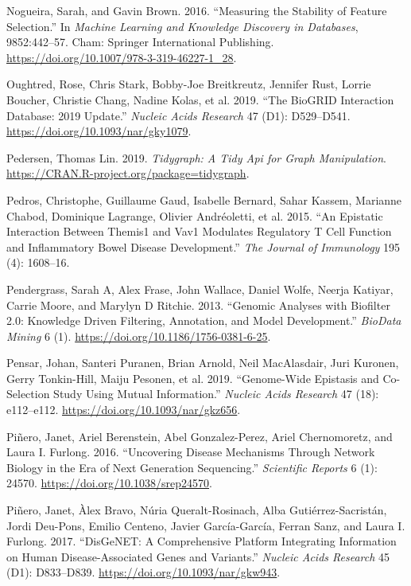 \documentclass[
  11pt,
]{env/yjiao}
\newlength{\cslhangindent}
\newenvironment{cslreferences}%
  {\setlength{\parindent}{0pt}%
  \everypar{\setlength{\hangindent}{\cslhangindent}}\ignorespaces}%
  {\par}
\begin{document}
\begin{cslreferences}
\leavevmode\hypertarget{ref-nogueira_measuring_2016}{}%
Nogueira, Sarah, and Gavin Brown. 2016. ``Measuring the Stability of Feature Selection.'' In \emph{Machine Learning and Knowledge Discovery in Databases}, 9852:442--57. Cham: Springer International Publishing. \url{https://doi.org/10.1007/978-3-319-46227-1_28}.

\leavevmode\hypertarget{ref-oughtred_biogrid_2019}{}%
Oughtred, Rose, Chris Stark, Bobby-Joe Breitkreutz, Jennifer Rust, Lorrie Boucher, Christie Chang, Nadine Kolas, et al. 2019. ``The BioGRID Interaction Database: 2019 Update.'' \emph{Nucleic Acids Research} 47 (D1): D529--D541. \url{https://doi.org/10.1093/nar/gky1079}.

\leavevmode\hypertarget{ref-pedersen_tidygraph_2019}{}%
Pedersen, Thomas Lin. 2019. \emph{Tidygraph: A Tidy Api for Graph Manipulation}. \url{https://CRAN.R-project.org/package=tidygraph}.

\leavevmode\hypertarget{ref-pedros2015epistatic}{}%
Pedros, Christophe, Guillaume Gaud, Isabelle Bernard, Sahar Kassem, Marianne Chabod, Dominique Lagrange, Olivier Andréoletti, et al. 2015. ``An Epistatic Interaction Between Themis1 and Vav1 Modulates Regulatory T Cell Function and Inflammatory Bowel Disease Development.'' \emph{The Journal of Immunology} 195 (4): 1608--16.

\leavevmode\hypertarget{ref-pendergrass_genomic_2013}{}%
Pendergrass, Sarah A, Alex Frase, John Wallace, Daniel Wolfe, Neerja Katiyar, Carrie Moore, and Marylyn D Ritchie. 2013. ``Genomic Analyses with Biofilter 2.0: Knowledge Driven Filtering, Annotation, and Model Development.'' \emph{BioData Mining} 6 (1). \url{https://doi.org/10.1186/1756-0381-6-25}.

\leavevmode\hypertarget{ref-pensar_genome-wide_2019}{}%
Pensar, Johan, Santeri Puranen, Brian Arnold, Neil MacAlasdair, Juri Kuronen, Gerry Tonkin-Hill, Maiju Pesonen, et al. 2019. ``Genome-Wide Epistasis and Co-Selection Study Using Mutual Information.'' \emph{Nucleic Acids Research} 47 (18): e112--e112. \url{https://doi.org/10.1093/nar/gkz656}.

\leavevmode\hypertarget{ref-pinero_uncovering_2016}{}%
Piñero, Janet, Ariel Berenstein, Abel Gonzalez-Perez, Ariel Chernomoretz, and Laura I. Furlong. 2016. ``Uncovering Disease Mechanisms Through Network Biology in the Era of Next Generation Sequencing.'' \emph{Scientific Reports} 6 (1): 24570. \url{https://doi.org/10.1038/srep24570}.

\leavevmode\hypertarget{ref-pinero_disgenet:_2017}{}%
Piñero, Janet, Àlex Bravo, Núria Queralt-Rosinach, Alba Gutiérrez-Sacristán, Jordi Deu-Pons, Emilio Centeno, Javier García-García, Ferran Sanz, and Laura I. Furlong. 2017. ``DisGeNET: A Comprehensive Platform Integrating Information on Human Disease-Associated Genes and Variants.'' \emph{Nucleic Acids Research} 45 (D1): D833--D839. \url{https://doi.org/10.1093/nar/gkw943}.


\end{cslreferences}
\end{document}
